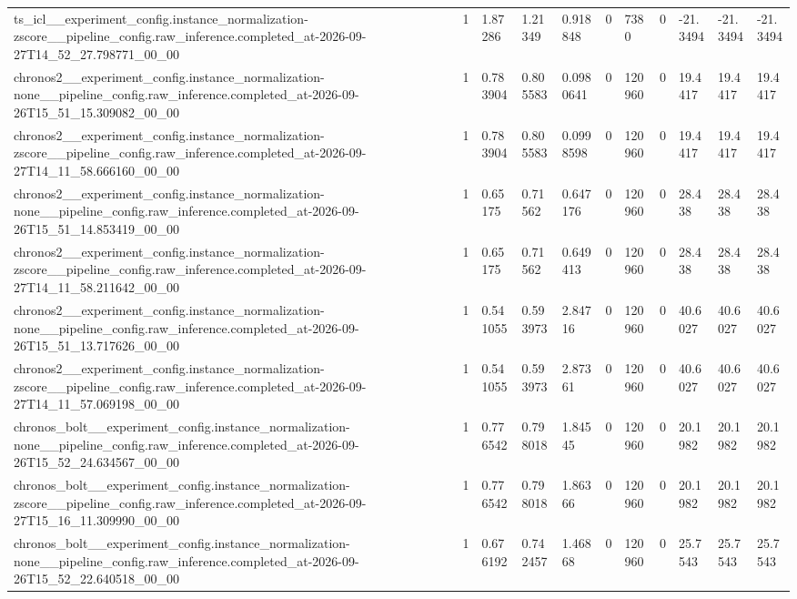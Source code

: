 \begin{tabular}{lllllllllll}
ts\_icl\_\_experiment\_config.instance\_normalization-zscore\_\_pipeline\_config.raw\_inference.completed\_at-2026-09-27T14\_52\_27.798771\_00\_00 & 1 & 1.87286 & 1.21349 & 0.918848 & 0 & 7380 & 0 & -21.3494 & -21.3494 & -21.3494 \\
chronos2\_\_experiment\_config.instance\_normalization-none\_\_pipeline\_config.raw\_inference.completed\_at-2026-09-26T15\_51\_15.309082\_00\_00 & 1 & 0.783904 & 0.805583 & 0.0980641 & 0 & 120960 & 0 & 19.4417 & 19.4417 & 19.4417 \\
chronos2\_\_experiment\_config.instance\_normalization-zscore\_\_pipeline\_config.raw\_inference.completed\_at-2026-09-27T14\_11\_58.666160\_00\_00 & 1 & 0.783904 & 0.805583 & 0.0998598 & 0 & 120960 & 0 & 19.4417 & 19.4417 & 19.4417 \\
chronos2\_\_experiment\_config.instance\_normalization-none\_\_pipeline\_config.raw\_inference.completed\_at-2026-09-26T15\_51\_14.853419\_00\_00 & 1 & 0.65175 & 0.71562 & 0.647176 & 0 & 120960 & 0 & 28.438 & 28.438 & 28.438 \\
chronos2\_\_experiment\_config.instance\_normalization-zscore\_\_pipeline\_config.raw\_inference.completed\_at-2026-09-27T14\_11\_58.211642\_00\_00 & 1 & 0.65175 & 0.71562 & 0.649413 & 0 & 120960 & 0 & 28.438 & 28.438 & 28.438 \\
chronos2\_\_experiment\_config.instance\_normalization-none\_\_pipeline\_config.raw\_inference.completed\_at-2026-09-26T15\_51\_13.717626\_00\_00 & 1 & 0.541055 & 0.593973 & 2.84716 & 0 & 120960 & 0 & 40.6027 & 40.6027 & 40.6027 \\
chronos2\_\_experiment\_config.instance\_normalization-zscore\_\_pipeline\_config.raw\_inference.completed\_at-2026-09-27T14\_11\_57.069198\_00\_00 & 1 & 0.541055 & 0.593973 & 2.87361 & 0 & 120960 & 0 & 40.6027 & 40.6027 & 40.6027 \\
chronos\_bolt\_\_experiment\_config.instance\_normalization-none\_\_pipeline\_config.raw\_inference.completed\_at-2026-09-26T15\_52\_24.634567\_00\_00 & 1 & 0.776542 & 0.798018 & 1.84545 & 0 & 120960 & 0 & 20.1982 & 20.1982 & 20.1982 \\
chronos\_bolt\_\_experiment\_config.instance\_normalization-zscore\_\_pipeline\_config.raw\_inference.completed\_at-2026-09-27T15\_16\_11.309990\_00\_00 & 1 & 0.776542 & 0.798018 & 1.86366 & 0 & 120960 & 0 & 20.1982 & 20.1982 & 20.1982 \\
chronos\_bolt\_\_experiment\_config.instance\_normalization-none\_\_pipeline\_config.raw\_inference.completed\_at-2026-09-26T15\_52\_22.640518\_00\_00 & 1 & 0.676192 & 0.742457 & 1.46868 & 0 & 120960 & 0 & 25.7543 & 25.7543 & 25.7543 \\

\end{tabular}
